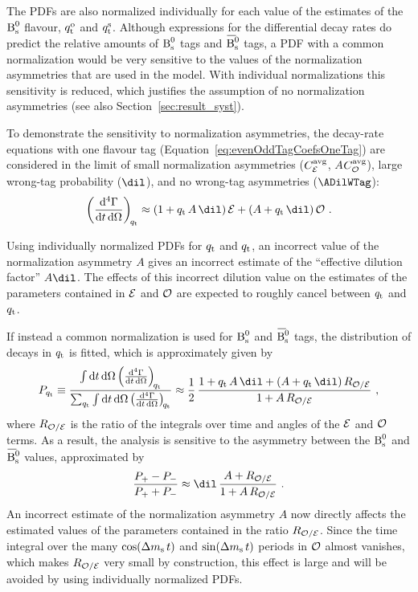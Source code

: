 The PDFs are also normalized individually for each value of the estimates of the $\text{B}_\text{s}^\text{0}$ flavour, ${q_\mathrm{t}^\text{o}}$ and ${q_\mathrm{t}^\text{s}}$. Although expressions
for the differential decay rates do predict the relative amounts of $\text{B}_\text{s}^\text{0}$ tags and $\Bsbar$ tags, a PDF with a common normalization would
be very sensitive to the values of the normalization asymmetries that are used in the model. With individual normalizations this
sensitivity is reduced, which justifies the assumption of no normalization asymmetries (see also Section~\ref{sec:result_syst}).

To demonstrate the sensitivity to normalization asymmetries, the decay-rate equations with one flavour tag
(Equation~\ref{eq:evenOddTagCoefsOneTag}) are considered in the limit of small normalization asymmetries (${C_{\mathcal{E}_{}}^{\text{avg}}}$,
$A$\textequiv${C_{\mathcal{O}_{}}^{\text{avg}}}$), large wrong-tag probability ($\dil$), and no wrong-tag asymmetries
($\ADilWTag$):
\begin{equation}
  \left(\frac{\ud^4\Gamma}{\ud t\, \ud\Omega}\right)_{\!\qt}
      \approx (1 + \qt\,A\,\dil)\,\even + (A + \qt\,\dil)\,\odd \ .
\end{equation}

Using individually normalized PDFs for $q_\mathrm{t}$\texteq{} and $q_\mathrm{t}$\texteq{}, an incorrect value of the normalization asymmetry $A$
gives an incorrect estimate of the ``effective dilution factor'' $A$\textpm$\dil$. The effects of this incorrect dilution value on the
estimates of the parameters contained in $\mathcal{E}$ and $\mathcal{O}$ are expected to roughly cancel between $q_\mathrm{t}$\texteq{} and $q_\mathrm{t}$\texteq{}.

If instead a common normalization is used for $\text{B}_\text{s}^\text{0}$ and $\Bsbar$ tags, the distribution of decays in $q_\mathrm{t}$ is fitted, which is
approximately given by
\begin{equation}
  P_{\qt}
    \equiv \frac{\int\ud t\, \ud\Omega\left(\frac{\ud^4\Gamma}{\ud t\, \ud\Omega}\right)_{\!\qt}}
                {\sum_{\qt}\int\ud t\, \ud\Omega\left(\frac{\ud^4\Gamma}{\ud t\, \ud\Omega}\right)_{\!\qt}}
    \approx \frac{1}{2}\, \frac{1 + \qt\,A\,\dil + (A + \qt\,\dil)\,R_{\odd/\even}}{1 + A\,R_{\odd/\even}}\ ,
\end{equation}
where $R_{\mathcal{O}/\mathcal{E}}$ is the ratio of the integrals over time and angles of the $\mathcal{E}$ and $\mathcal{O}$ terms. As a result, the
analysis is sensitive to the asymmetry between the $\text{B}_\text{s}^\text{0}$ and $\Bsbar$ values, approximated by
\begin{equation}
  \frac{P_+ - P_-}{P_+ + P_-} \approx \dil\, \frac{A + R_{\odd/\even}}{1 + A\,R_{\odd/\even}}\ .
\end{equation}
An incorrect estimate of the normalization asymmetry $A$ now directly affects the estimated values of the parameters contained in the ratio
$R_{\mathcal{O}/\mathcal{E}}$. Since the time integral over the many $\cos\!\left(\Delta m_\text{s}\, t\right)$ and $\sin\!\left(\Delta m_\text{s}\, t\right)$ periods in $\mathcal{O}$ almost vanishes, which makes $R_{\mathcal{O}/\mathcal{E}}$
very small by construction, this effect is large and will be avoided by using individually normalized PDFs.

